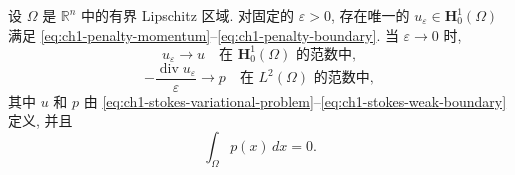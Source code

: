 \begin{Theorem}
\label{thm:ch1-penalty-convergence}
设 $\Omega$ 是 $\mathbb R^n$ 中的有界 Lipschitz 区域. 对固定的 $\varepsilon>0$, 存在唯一的 $u_\varepsilon\in\mathbf H_0^1(\Omega)$ 满足 \eqref{eq:ch1-penalty-momentum}--\eqref{eq:ch1-penalty-boundary}. 当 $\varepsilon\to0$ 时,
\begin{equation}
u_\varepsilon\longrightarrow u
\quad\text{在 }\mathbf H_0^1(\Omega)\text{ 的范数中},
\label{eq:ch1-penalty-velocity-convergence}
\end{equation}
\begin{equation}
-\frac{\operatorname{div}u_\varepsilon}{\varepsilon}
\longrightarrow p
\quad\text{在 }L^2(\Omega)\text{ 的范数中},
\label{eq:ch1-penalty-pressure-convergence}
\end{equation}
其中 $u$ 和 $p$ 由 \eqref{eq:ch1-stokes-variational-problem}--\eqref{eq:ch1-stokes-weak-boundary} 定义, 并且
\begin{equation}
\int_\Omega p(x)\,dx=0.
\label{eq:ch1-penalty-pressure-zero-mean}
\end{equation}
\end{Theorem}


